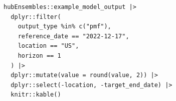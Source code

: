 \documentclass[
  article,
  shortnames,
  notitle]{jss}
\begin{document}
\begin{verbatim}
hubEnsembles::example_model_output |>
  dplyr::filter(
    output_type %in% c("pmf"),
    reference_date == "2022-12-17",
    location == "US",
    horizon == 1
  ) |>
  dplyr::mutate(value = round(value, 2)) |>
  dplyr::select(-location, -target_end_date) |>
  knitr::kable()
\end{verbatim}

\begin{longtable}[]{@{}
  >{\raggedright\arraybackslash}p{}
  >{\raggedright\arraybackslash}p{}
  >{\raggedleft\arraybackslash}p{}
  >{\raggedright\arraybackslash}p{}
  >{\raggedright\arraybackslash}p{}
  >{\raggedright\arraybackslash}p{}
  >{\raggedleft\arraybackslash}p{}@{}}


\end{longtable}
\end{document}
